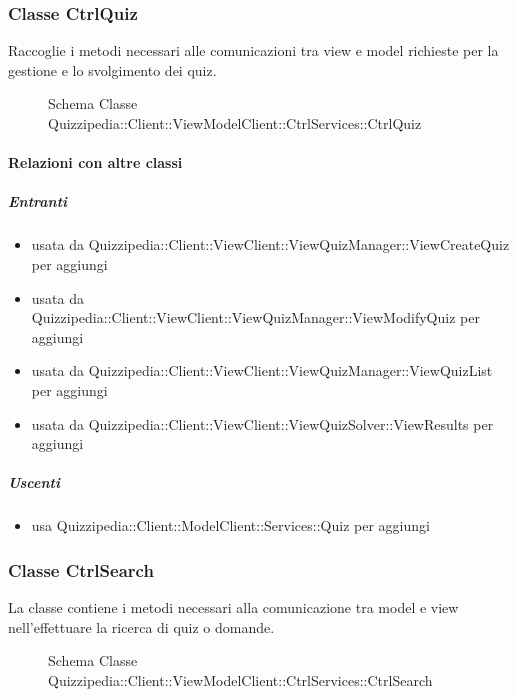 \subsubsection{Classe CtrlQuiz}
Raccoglie i metodi necessari alle comunicazioni tra view e model richieste per la gestione e lo svolgimento dei quiz.
\begin{figure}[H]
\centering
\noindent{}
\caption[Schema Classe CtrlQuiz]{Schema Classe Quizzipedia::Client::ViewModelClient::CtrlServices::CtrlQuiz}
\end{figure}
\paragraph{Relazioni con altre classi}
\subparagraph{Entranti}
\begin{itemize}
\item usata da Quizzipedia::Client::ViewClient::ViewQuizManager::ViewCreateQuiz per aggiungi
\item usata da Quizzipedia::Client::ViewClient::ViewQuizManager::ViewModifyQuiz per aggiungi
\item usata da Quizzipedia::Client::ViewClient::ViewQuizManager::ViewQuizList per aggiungi
\item usata da Quizzipedia::Client::ViewClient::ViewQuizSolver::ViewResults per aggiungi
\end{itemize}
\subparagraph{Uscenti}
\begin{itemize}
\item usa Quizzipedia::Client::ModelClient::Services::Quiz per aggiungi
\end{itemize}
\subsubsection{Classe CtrlSearch}
La classe contiene i metodi necessari alla comunicazione tra model e view nell'effettuare la ricerca di quiz o domande.
\begin{figure}[H]
\centering
\noindent{}
\caption[Schema Classe CtrlSearch]{Schema Classe Quizzipedia::Client::ViewModelClient::CtrlServices::CtrlSearch}
\end{figure}
